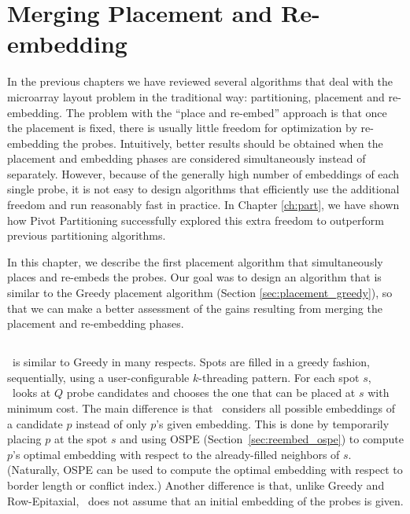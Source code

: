 \chapter{Merging Placement and Re-embedding}
\label{ch:merge}

In the previous chapters we have reviewed several algorithms that deal with the
microarray layout problem in the traditional way: partitioning, placement and
re-embedding. The problem with the ``place and re-embed'' approach is that once
the placement is fixed, there is usually little freedom for optimization by
re-embedding the probes. Intuitively, better results should be obtained when the
placement and embedding phases are considered simultaneously instead of
separately. However, because of the generally high number of embeddings of each
single probe, it is not easy to design algorithms that efficiently use the
additional freedom and run reasonably fast in practice. In Chapter
\ref{ch:part}, we have shown how Pivot Partitioning successfully explored this
extra freedom to outperform previous partitioning algorithms.

In this chapter, we describe the first placement algorithm that simultaneously
places and re-embeds the probes. Our goal was to design an algorithm that is
similar to the Greedy placement algorithm (Section \ref{sec:placement_greedy}),
so that we can make a better assessment of the gains resulting from merging the
placement and re-embedding phases.

\section{\Greedyplus}
\label{sec:merge_greedyplus}

\Greedyplus\ is similar to Greedy in many respects. Spots are filled in a greedy
fashion, sequentially, using a user-configurable $k$-threading pattern. For each
spot $s$, \Greedyplus\ looks at $Q$ probe candidates and chooses the one that
can be placed at $s$ with minimum cost. The main difference is that \Greedyplus\
considers all possible embeddings of a candidate $p$ instead of only $p$'s given
embedding. This is done by temporarily placing $p$ at the spot $s$ and using
OSPE (Section~\ref{sec:reembed_ospe}) to compute $p$'s optimal embedding with
respect to the already-filled neighbors of $s$. (Naturally, OSPE can be used to
compute the optimal embedding with respect to border length or conflict index.)
Another difference is that, unlike Greedy and Row-Epitaxial, \Greedyplus\ does
not assume that an initial embedding of the probes is given.

